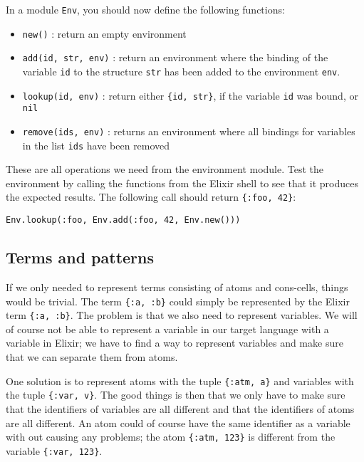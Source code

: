 \documentclass[a4paper,11pt]{article}
\begin{document}
In a module {\tt Env}, you should now define the following functions:

\begin{itemize}
\item {\tt new()} : return an empty environment

\item {\tt add(id, str, env)} : return an environment where the
  binding of the variable {\tt id} to the structure {\tt str} has been
  added to the environment {\tt env}.

\item {\tt lookup(id, env)} : return either {\tt \{id, str\}}, if the
  variable {\tt id} was bound, or {\tt nil}

\item {\tt remove(ids, env)} : returns an environment where all
  bindings for variables in the list {\tt ids} have been removed
\end{itemize}

These are all operations we need from the environment module. Test the
environment by calling the functions from the Elixir shell to see that
it produces the expected results. The following
call should return {\tt \{:foo,  42\}}:

\begin{verbatim}
Env.lookup(:foo, Env.add(:foo, 42, Env.new()))
\end{verbatim}

\subsection{Terms and patterns}

If we only needed to represent terms consisting of atoms and
cons-cells, things would be trivial. The term {\tt \{:a, :b\}} could
simply be represented by the Elixir term {\tt \{:a, :b\}}. The problem
is that we also need to represent variables. We will of
course not be able to represent a variable in our target language with
a variable in Elixir; we have to find a way to represent variables and
make sure that we can separate them from atoms.

One solution is to represent atoms with the tuple {\tt \{:atm, a\}} and
variables with the tuple {\tt \{:var, v\}}. The good things is then
that we only have to make sure that the identifiers of variables are
all different and that the identifiers of atoms are all different. An
atom could of course have the same identifier as a variable with out
causing any problems; the atom {\tt \{:atm, 123\}} is different from
the variable {\tt \{:var, 123\}}.
\end{document}
